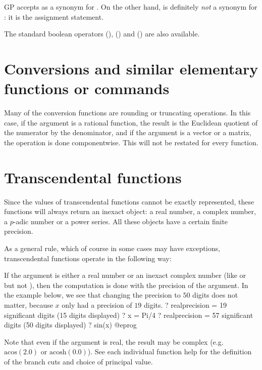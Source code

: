 GP accepts \kbd{<>} as a synonym for \kbd{!=}. On the other hand, \kbd{=} is
definitely \emph{not} a synonym for \kbd{==}: it is the assignment statement.

The standard boolean operators \kbd{||} (), \kbd{\&\&}
() and \kbd{!} () are also available.

\section{Conversions and similar elementary functions or commands}
\label{se:conversion}

\noindent
Many of the conversion functions are rounding or truncating operations. In
this case, if the argument is a rational function, the result is the
Euclidean quotient of the numerator by the denominator, and if the argument
is a vector or a matrix, the operation is done componentwise. This will not
be restated for every function.


\section{Transcendental functions}\label{se:trans}

Since the values of transcendental functions cannot be exactly represented,
these functions will always return an inexact object: a real number,
a complex number, a $p$-adic number or a power series.  All these objects
have a certain finite precision.

As a general rule, which of course in some cases may have exceptions,
transcendental functions operate in the following way:

\item If the argument is either a real number or an inexact complex number
(like  or  but not ), then the
computation is done with the precision of the argument.
In the example below, we see that changing the precision to $50$ digits does
not matter, because $x$ only had a precision of $19$ digits.
\bprog
? 
   realprecision = 19 significant digits (15 digits displayed)
? x = Pi/4
? 
   realprecision = 57 significant digits (50 digits displayed)
? sin(x)
@eprog

Note that even if the argument is real, the result may be complex
(e.g.~$\text{acos}(2.0)$ or $\text{acosh}(0.0)$). See each individual
function help for the definition of the branch cuts and choice of principal
value.

